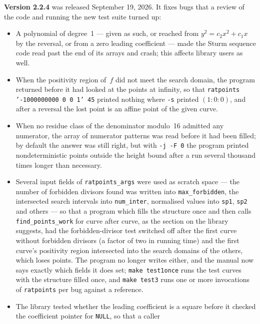\documentclass[12pt,a4paper,oneside]{amsart}
\begin{document}
\textbf{Version 2.2.4} was released September 19, 2026. It fixes bugs that a
review of the code and running the new test suite turned up:
\begin{itemize}
  \item A polynomial of degree~1 --- given as such,
        or reached from $y^2 = c_2x^2 + c_1x$ by the reversal, or from a zero
        leading coefficient --- made the Sturm sequence code read past the end of
        its arrays and crash; this affects library users as well.
  \item When the positivity region of~$f$ did not meet the search domain, the program
        returned before it had looked at the points at infinity, so that
        \texttt{ratpoints '-1000000000 0 0 1' 45} printed nothing where \verb+-s+
        printed $(1:0:0)$, and after a reversal the lost point is an affine point
        of the given curve.
  \item When no residue class of the denominator modulo~16
        admitted any numerator, the array of numerator patterns was read before it
        had been filled; by default the answer was still right, but with
        \verb+-j -F 0+ the program printed nondeterministic points outside the
        height bound after a run several thousand times longer than necessary.
  \item Several input fields of \texttt{ratpoints\_args} were used as scratch
        space --- the number of forbidden divisors found was written into
        \texttt{max\_forbidden}, the intersected search intervals into
        \texttt{num\_inter}, normalised values into \texttt{sp1}, \texttt{sp2}
        and others --- so that a program which fills the structure once and then
        calls \texttt{find\_points\_work} for curve after curve, as the section on
        the library suggests, had the forbidden-divisor test switched off after the
        first curve without forbidden divisors (a factor of two in running time)
        and the first curve's positivity region intersected into the search domains
        of the others, which loses points. The program no longer writes either,
        and the manual now says exactly which fields it does set;
        \texttt{make test1once} runs the test curves with the structure filled
        once, and \texttt{make test3} runs one or more invocations of
        \texttt{ratpoints} per bug against a reference.
  \item The library tested whether the leading coefficient is a square before
        it checked the coefficient pointer for \texttt{NULL}, so that a caller

\end{itemize}
\end{document}
